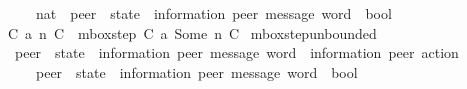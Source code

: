 \begin{isabellebody}
\ \ \ \ \ \ nat\ {\isasymRightarrow}\ {\isacharparenleft}{\kern0pt}{\isacharprime}{\kern0pt}peer\ {\isasymRightarrow}\ {\isacharparenleft}{\kern0pt}{\isacharprime}{\kern0pt}state\ {\isasymtimes}\ {\isacharparenleft}{\kern0pt}{\isacharprime}{\kern0pt}information{\isacharcomma}{\kern0pt}\ {\isacharprime}{\kern0pt}peer{\isacharparenright}{\kern0pt}\ message\ word{\isacharparenright}{\kern0pt}{\isacharparenright}{\kern0pt}\ {\isasymRightarrow}\ bool{\isachardoublequoteclose}\isanewline
\ \ {\isacharparenleft}{\kern0pt}{\isachardoublequoteopen}{\isacharunderscore}{\kern0pt}\ {\isasymmidarrow}{\isasymlangle}{\isacharunderscore}{\kern0pt}{\isacharcomma}{\kern0pt}\ {\isacharunderscore}{\kern0pt}{\isasymrangle}{\isasymrightarrow}\ {\isacharunderscore}{\kern0pt}{\isachardoublequoteclose}\ {\isacharbrackleft}{\kern0pt}{}{}{\isacharcomma}{\kern0pt}\ {}{}{\isacharcomma}{\kern0pt}\ {}{}{\isacharcomma}{\kern0pt}\ {}{}{\isacharbrackright}{\kern0pt}\ {}{}{}{\isacharparenright}{\kern0pt}\ \isanewline
\ \ {\isachardoublequoteopen}C{}\ {\isasymmidarrow}{\isasymlangle}a{\isacharcomma}{\kern0pt}\ n{\isasymrangle}{\isasymrightarrow}\ C{}\ {\isasymequiv}\ mbox{\isacharunderscore}{\kern0pt}step\ C{}\ a\ {\isacharparenleft}{\kern0pt}Some\ n{\isacharparenright}{\kern0pt}\ C{}{\isachardoublequoteclose}\isanewline
\isanewline
{}\isamarkupfalse%
\ mbox{\isacharunderscore}{\kern0pt}step{\isacharunderscore}{\kern0pt}unbounded\isanewline
\ \ {\isacharcolon}{\kern0pt}{\isacharcolon}{\kern0pt}\ {\isachardoublequoteopen}{\isacharparenleft}{\kern0pt}{\isacharprime}{\kern0pt}peer\ {\isasymRightarrow}\ {\isacharparenleft}{\kern0pt}{\isacharprime}{\kern0pt}state\ {\isasymtimes}\ {\isacharparenleft}{\kern0pt}{\isacharprime}{\kern0pt}information{\isacharcomma}{\kern0pt}\ {\isacharprime}{\kern0pt}peer{\isacharparenright}{\kern0pt}\ message\ word{\isacharparenright}{\kern0pt}{\isacharparenright}{\kern0pt}\ {\isasymRightarrow}\ {\isacharparenleft}{\kern0pt}{\isacharprime}{\kern0pt}information{\isacharcomma}{\kern0pt}\ {\isacharprime}{\kern0pt}peer{\isacharparenright}{\kern0pt}\ action\ {\isasymRightarrow}\isanewline
\ \ \ \ \ \ {\isacharparenleft}{\kern0pt}{\isacharprime}{\kern0pt}peer\ {\isasymRightarrow}\ {\isacharparenleft}{\kern0pt}{\isacharprime}{\kern0pt}state\ {\isasymtimes}\ {\isacharparenleft}{\kern0pt}{\isacharprime}{\kern0pt}information{\isacharcomma}{\kern0pt}\ {\isacharprime}{\kern0pt}peer{\isacharparenright}{\kern0pt}\ message\ word{\isacharparenright}{\kern0pt}{\isacharparenright}{\kern0pt}\ {\isasymRightarrow}\ bool{\isachardoublequoteclose}\isanewline

\end{isabellebody}
